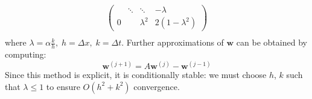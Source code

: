 \documentclass[8pt]{article}
\begin{document}
\begin{multicols}{2}
\begin{description}
\begin{equation*}
\begin{aligned}
\begin{pmatrix}
            & \ddots & \ddots & -\lambda\\
            0 & & \lambda^2 & 2(1-\lambda^2)
          \end{pmatrix} \\
      \end{aligned}
    \end{equation*}
    where $\lambda=\alpha\frac{k}{h},\;h=\Delta x,\;k=\Delta
    t$. Further approximations of $\mathbf{w}$ can be obtained by
    computing:
    $$ \mathbf{w}^{(j+1)} = A \mathbf{w}^{(j)} - \mathbf{w}^{(j-1)}$$
    Since this method is explicit, it is conditionally stable: we must
    choose $h$, $k$ such that $\lambda\leq1$ to ensure $O(h^2+k^2)$
    convergence.
  \end{description}
\end{multicols}
\end{document}
